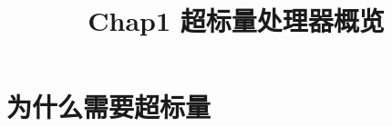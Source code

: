\documentclass{article}
\title{Chap1 超标量处理器概览}
\author{}
\date{}
\begin{document}
  \maketitle
  \section{为什么需要超标量}
\end{document}
